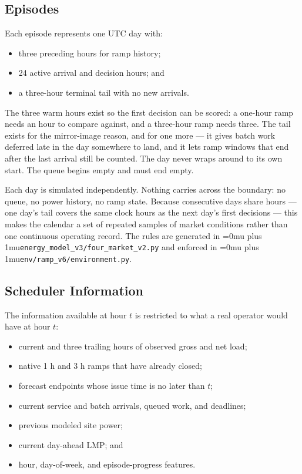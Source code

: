 \documentclass[12pt]{article}
\newcommand{\codepath}[1]{{\Urlmuskip=0mu plus 1mu\relax\nolinkurl{#1}}}
\begin{document}
\subsection{Episodes}
\label{subsec:problem-episode}

Each episode represents one UTC day with:
\begin{itemize}
  \item three preceding hours for ramp history;
  \item 24 active arrival and decision hours; and
  \item a three-hour terminal tail with no new arrivals.
\end{itemize}

The three warm hours exist so the first decision can be scored: a one-hour ramp needs an hour to compare against, and a three-hour ramp needs three. The tail exists for the mirror-image reason, and for one more --- it gives batch work deferred late in the day somewhere to land, and it lets ramp windows that end after the last arrival still be counted. The day never wraps around to its own start. The queue begins empty and must end empty.

Each day is simulated independently. Nothing carries across the boundary: no queue, no power history, no ramp state. Because consecutive days share hours --- one day's tail covers the same clock hours as the next day's first decisions --- this makes the calendar a set of repeated samples of market conditions rather than one continuous operating record. The rules are generated in \codepath{energy_model_v3/four_market_v2.py} and enforced in \codepath{env/ramp_v6/environment.py}.

\subsection{Scheduler Information}
\label{subsec:problem-causality}

The information available at hour \(t\) is restricted to what a real operator would have at hour \(t\):
\begin{itemize}
  \item current and three trailing hours of observed gross and net load;
  \item native 1 h and 3 h ramps that have already closed;
  \item forecast endpoints whose issue time is no later than \(t\);
  \item current service and batch arrivals, queued work, and deadlines;
  \item previous modeled site power;
  \item current day-ahead LMP; and
  \item hour, day-of-week, and episode-progress features.
\end{itemize}
\end{document}
